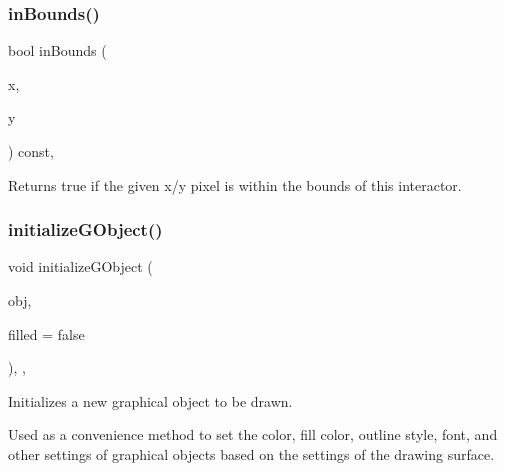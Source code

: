 \subsubsection{\texorpdfstring{in\+Bounds()}{inBounds()}\hspace{0.1cm}{\footnotesize\ttfamily [2/2]}}
{\footnotesize\ttfamily bool in\+Bounds (\begin{DoxyParamCaption}\item[{int}]{x,  }\item[{int}]{y }\end{DoxyParamCaption}) const\hspace{0.3cm}{\ttfamily [virtual]}, {\ttfamily [inherited]}}



Returns true if the given x/y pixel is within the bounds of this interactor. 

\mbox{\label{classGDrawingSurface_a814498efebc5586645159cd22990cf61}} 
\subsubsection{\texorpdfstring{initialize\+G\+Object()}{initializeGObject()}\hspace{0.1cm}{\footnotesize\ttfamily [1/2]}}
{\footnotesize\ttfamily void initialize\+G\+Object (\begin{DoxyParamCaption}\item[{\mbox{\hyperlink{classGObject}{G\+Object}} \&}]{obj,  }\item[{bool}]{filled = {\ttfamily false} }\end{DoxyParamCaption})\hspace{0.3cm}{\ttfamily [protected]}, {\ttfamily [virtual]}, {\ttfamily [inherited]}}



Initializes a new graphical object to be drawn. 

Used as a convenience method to set the color, fill color, outline style, font, and other settings of graphical objects based on the settings of the drawing surface. \mbox{\label{classGDrawingSurface_a43e6bc951980da061ddc40407daee227}} 
